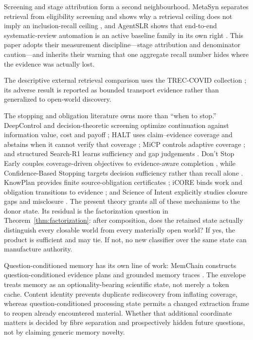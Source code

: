 \documentclass[11pt]{article}
\theoremstyle{definition}
\begin{document}
Screening and stage attribution form a second neighbourhood. MetaSyn separates retrieval from eligibility screening and shows why a retrieval ceiling does not imply an inclusion-recall ceiling \cite{metasyn2026}, and AgentSLR shows that end-to-end systematic-review automation is an active baseline family in its own right \cite{agentslr2026}. This paper adopts their measurement discipline---stage attribution and denominator caution---and inherits their warning that one aggregate recall number hides where the evidence was actually lost.

The descriptive external retrieval comparison uses the TREC-COVID collection
\cite{voorhees2020treccovid}; its adverse result is reported as bounded transport
evidence rather than generalized to open-world discovery.

The stopping and obligation literature owns more than ``when to stop.''
DeepControl and decision-theoretic screening optimize continuation against
information value, cost and payoff \cite{deepcontrol2026,decisionstop2026}; HALT
uses claim--evidence coverage and abstains when it cannot verify that coverage
\cite{halt2026}; MiCP controls adaptive coverage \cite{micp2026}; and structured
Search-R1 learns sufficiency and gap judgements \cite{multiragstop2026}.  Don't
Stop Early couples coverage-driven objectives to evidence-aware completion
\cite{donotstopearly2026}, while Confidence-Based Stopping targets decision
sufficiency rather than recall alone \cite{confidencebasedstop2026}.  KnowPlan
provides finite source-obligation certificates \cite{knowplan2026}; iCORE binds
work and obligation transitions to evidence \cite{icore2026}; and Science of
Intent explicitly studies closure gaps and misclosure \cite{scienceintent2026}.
The present theory grants all of these mechanisms to the donor state.  Its
residual is the factorization question in Theorem~\ref{thm:factorization}: after
composition, does the retained state actually distinguish every closable world
from every materially open world?  If yes, the product is sufficient and may
tie.  If not, no new classifier over the same state can manufacture authority.

Question-conditioned memory has its own line of work: MemChain constructs
question-conditioned evidence plans and grounded memory traces
\cite{memchain2026}.  The envelope treats memory as an optionality-bearing
scientific state, not merely a token cache.  Content identity prevents duplicate
rediscovery from inflating coverage, whereas question-conditioned processing
state permits a changed extraction frame to reopen already encountered material.
Whether that additional coordinate matters is decided by fibre separation and
prospectively hidden future questions, not by claiming generic memory novelty.
\end{document}
